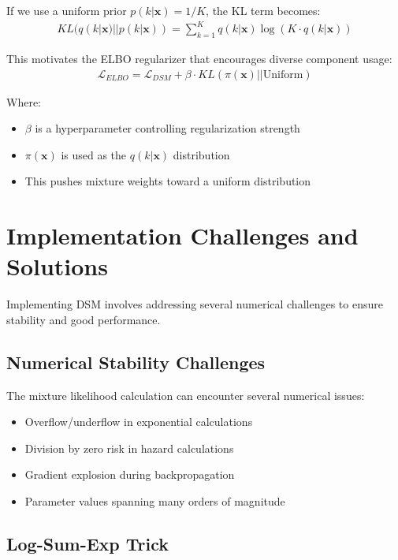 If we use a uniform prior $p(k|\mathbf{x}) = 1/K$, the KL term becomes:
\begin{align}
    KL(q(k|\mathbf{x})||p(k|\mathbf{x})) = \sum_{k=1}^K q(k|\mathbf{x}) \log(K \cdot q(k|\mathbf{x}))
\end{align}

This motivates the ELBO regularizer that encourages diverse component usage:
\begin{align}
    \mathcal{L}_{ELBO} = \mathcal{L}_{DSM} + \beta \cdot KL(\pi(\mathbf{x})||\text{Uniform})
\end{align}

Where:
\begin{itemize}
    \item $\beta$ is a hyperparameter controlling regularization strength
    \item $\pi(\mathbf{x})$ is used as the $q(k|\mathbf{x})$ distribution
    \item This pushes mixture weights toward a uniform distribution
\end{itemize}

\section{Implementation Challenges and Solutions}

Implementing DSM involves addressing several numerical challenges to ensure stability and good performance.

\subsection{Numerical Stability Challenges}

The mixture likelihood calculation can encounter several numerical issues:
\begin{itemize}
    \item Overflow/underflow in exponential calculations
    \item Division by zero risk in hazard calculations
    \item Gradient explosion during backpropagation
    \item Parameter values spanning many orders of magnitude
\end{itemize}

\subsection{Log-Sum-Exp Trick}


